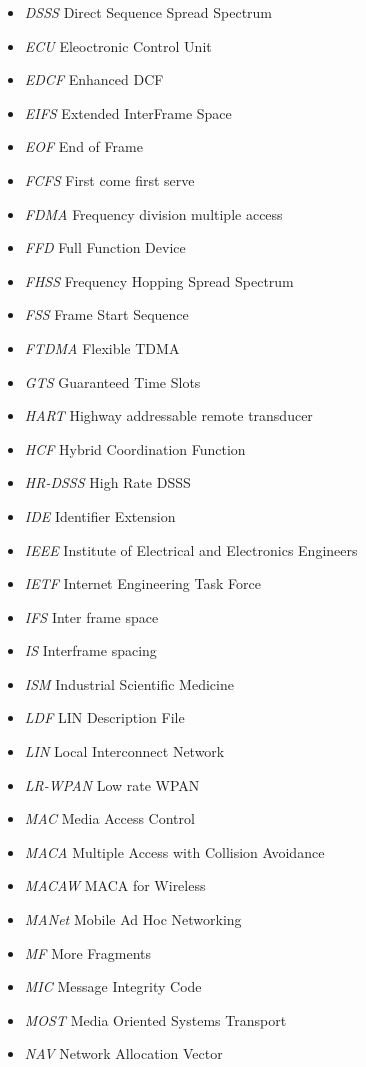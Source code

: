 \documentclass{article}
\begin{document}
\begin{itemize}
	\item \emph{DSSS} Direct Sequence Spread Spectrum
	\item \emph{ECU} Eleoctronic Control Unit
	\item \emph{EDCF} Enhanced DCF
	\item \emph{EIFS} Extended InterFrame Space
	\item \emph{EOF} End of Frame
	\item \emph{FCFS} First come first serve
	\item \emph{FDMA} Frequency division multiple access
	\item \emph{FFD} Full Function Device
	\item \emph{FHSS} Frequency Hopping Spread Spectrum
	\item \emph{FSS} Frame Start Sequence
	\item \emph{FTDMA} Flexible TDMA
	\item \emph{GTS} Guaranteed Time Slots
	\item \emph{HART} Highway addressable remote transducer
	\item \emph{HCF} Hybrid Coordination Function
	\item \emph{HR-DSSS} High Rate DSSS
	\item \emph{IDE} Identifier Extension
	\item \emph{IEEE} Institute of Electrical and Electronics Engineers 
	\item \emph{IETF} Internet Engineering Task Force
	\item \emph{IFS} Inter frame space
	\item \emph{IS} Interframe spacing
	\item \emph{ISM} Industrial Scientific Medicine
	\item \emph{LDF} LIN Description File
	\item \emph{LIN} Local Interconnect Network
	\item \emph{LR-WPAN} Low rate WPAN
	\item \emph{MAC} Media Access Control
	\item \emph{MACA} Multiple Access with Collision Avoidance
	\item \emph{MACAW} MACA for Wireless
	\item \emph{MANet} Mobile Ad Hoc Networking
	\item \emph{MF} More Fragments
	\item \emph{MIC} Message Integrity Code
	\item \emph{MOST} Media Oriented Systems Transport
	\item \emph{NAV} Network Allocation Vector

\end{itemize}
\end{document}
